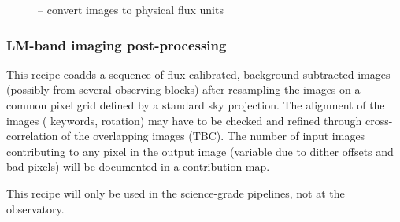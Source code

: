 \begin{figure}[hb]
  \centering
  \caption[Recipe: ]{ --
    convert images to physical flux units}
  \label{fig:metis_lm_img_calibrate}
\end{figure}

\clearpage
\subsubsection{LM-band imaging post-processing}
\label{sssec:lm_img_postprocess}

This recipe coadds a sequence of flux-calibrated,
background-subtracted images (possibly from several observing blocks)
after resampling the images on a common pixel grid defined by a
standard sky projection. The alignment of the images (
keywords, rotation) may have to be checked and refined through
cross-correlation of the overlapping images (TBC). The number of input
images contributing to any pixel in the output image (variable due to
dither offsets and bad pixels) will be documented in a contribution
map.

This recipe will only be used in the science-grade pipelines, not at
the observatory.

